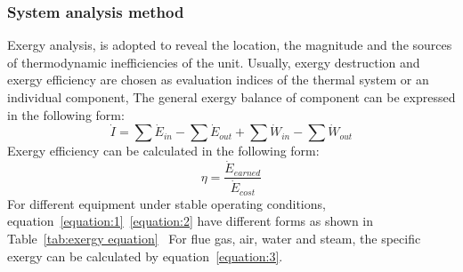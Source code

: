\documentclass[preprint,12pt]{elsarticle}
\begin{document}
\subsubsection{System analysis method} %
\label{ssub3:analsys method} 
Exergy analysis, is adopted to reveal the location, the magnitude and the sources of thermodynamic inefficiencies of the unit.
Usually, exergy destruction and exergy efficiency are chosen as evaluation indices of the thermal system or an individual component, 
The general exergy balance of component can be expressed in the following form:
\begin{equation}
\label{equation:1}
\dot{I}=\sum\dot{E}{}_{in}-\sum\dot{E}{}_{out}+\sum\dot{W}{}_{in}-\sum\dot{W}{}_{out}
\end{equation}
Exergy efficiency can be calculated in the following form:
\begin{equation}
\label{equation:2}
\eta=\frac{\dot{E}{}_{earned}}{\dot{E}{}_{cost}}
\end{equation}
For different equipment under stable operating conditions, equation~\ref{equation:1}~\ref{equation:2} have different forms as shown in Table~\ref{tab:exergy equation}~\cite{Aljundi2009Energy}
For flue gas, air, water and steam, the specific exergy can be calculated by equation~\ref{equation:3}.
\end{document}

